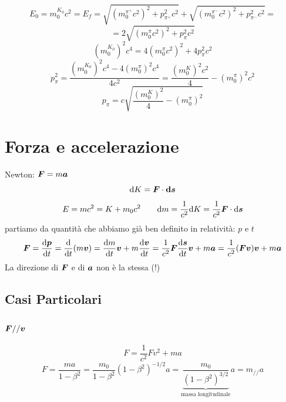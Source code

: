 \begin{Es}
\begin{equation*}E_0=m_0^{K_0}c^2=E_f=\sqrt{(m_0^{\pi^+}c^2)^2+p_{\pi^+}^2c^2}+\sqrt{(m_0^{\pi^-}c^2)^2+p_{\pi^-}^2c^2}=\end{equation*}
\begin{equation*}=2\sqrt{(m_0^\pi c^2)^2+p_{\pi}^2c^2}\end{equation*}
\begin{equation*}(m_0^{K_0})^2c^4=4(m_0^\pi c^2)^2+4p_{\pi}^2c^2\end{equation*}
\begin{equation*}p_\pi^2=\frac{(m_0^{K_0})^2c^4-4(m_0^{\pi})^2c^4}{4c^2}=\frac{(m_0^K)^2c^2}{4}-(m_0^\pi)^2c^2\end{equation*}
\begin{equation*}p_\pi=c\sqrt{\frac{(m_0^K)^2}{4}-(m_0^\pi)^2}\end{equation*}
\end{Es}
\section{Forza e accelerazione}
Newton: $\boldsymbol{F}=m\boldsymbol{a}$
\begin{equation*}\mathrm{d} K=\boldsymbol{F}\cdot\boldsymbol{ \mathrm{d} s}\end{equation*}
\begin{equation*}E=mc^2=K+m_0c^2\qquad \mathrm{d} m=\frac{1}{c^2}\mathrm{d} K=\frac{1}{c^2}\boldsymbol{F}\cdot \mathrm{d} \boldsymbol{s}\end{equation*}
partiamo da quantità che abbiamo già ben definito in relatività: $p$ e $t$
\begin{equation*}\boldsymbol{F}=\frac{\mathrm{d} \boldsymbol{p}}{\mathrm{d} t}=\frac{\mathrm{d}}{\mathrm{d} t}(m\boldsymbol{v})=\frac{\mathrm{d} m}{\mathrm{d} t}\boldsymbol{v}+m\frac{\mathrm{d} \boldsymbol{v}}{\mathrm{d} t}=\frac{1}{c^2}\boldsymbol{F}\frac{\mathrm{d} \boldsymbol{s}}{\mathrm{d} t}\boldsymbol{v}+m\boldsymbol{a}=\frac{1}{c^2}(\boldsymbol{F}\boldsymbol{v})\boldsymbol{v}+m\boldsymbol{a}\end{equation*}
La direzione di $\boldsymbol{F}$ e di $\boldsymbol{a}$ non è la stessa (!)
\subsection{Casi Particolari}
\subsubsection{$\boldsymbol{F} // \boldsymbol{v}$}
\begin{equation*}F=\frac{1}{c^2}Fv^2+ma\end{equation*}
\begin{equation*}F=\frac{ma}{1-\beta^2}=\frac{m_0}{1-\beta^2}(1-\beta^2)^{-1/2}a=\underbrace{\frac{m_0}{(1-\beta^2)^{3/2}}}_{\text{massa longitudinale}}a=m_{//}a\end{equation*}
